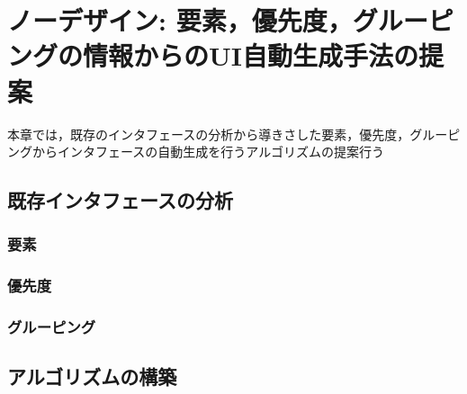 \chapter{ノーデザイン: 要素，優先度，グルーピングの情報からのUI自動生成手法の提案}
\label{chap:auto-gen}

本章では，既存のインタフェースの分析から導きさした要素，優先度，グルーピングからインタフェースの自動生成を行うアルゴリズムの提案行う
\section{既存インタフェースの分析}

\subsection{要素}

\subsection{優先度}

\subsection{グルーピング}

\section{アルゴリズムの構築}
